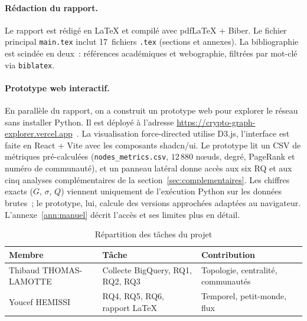 \paragraph{R\'edaction du rapport.}
Le rapport est r\'edig\'e en \LaTeX{} et compil\'e avec pdf\LaTeX{} + Biber.
Le fichier principal \texttt{main.tex} inclut 17~fichiers \texttt{.tex}
(sections et annexes). La bibliographie est scind\'ee en deux~: r\'ef\'erences
acad\'emiques et webographie, filtr\'ees par mot-cl\'e via \texttt{biblatex}.

\paragraph{Prototype web interactif.}
En parall\`ele du rapport, on a construit un prototype web pour explorer
le r\'eseau sans installer Python. Il est d\'eploy\'e \`a l'adresse
\url{https://crypto-graph-explorer.vercel.app}~\cite{cryptographexplorer_web}.
La visualisation force-directed utilise D3.js, l'interface est faite en
React + Vite avec les composants shadcn/ui. Le prototype lit un CSV de
m\'etriques pr\'e-calcul\'ees (\texttt{nodes\_metrics.csv}, $12\,880$
n\oe{}uds, degr\'e, PageRank et num\'ero de communaut\'e), et un panneau
lat\'eral donne acc\`es aux six RQ et aux cinq analyses compl\'ementaires
de la section~\ref{sec:complementaires}. Les chiffres exacts ($G$,
$\sigma$, $Q$) viennent uniquement de l'ex\'ecution Python sur les
donn\'ees brutes~; le prototype, lui, calcule des versions approch\'ees
adapt\'ees au navigateur. L'annexe~\ref{ann:manuel} d\'ecrit l'acc\`es
et ses limites plus en d\'etail.

\begin{table}[H]
\centering
\caption{R\'epartition des t\^aches du projet}
\label{tab:repartition}
\begin{tabular}{lll}
\toprule
\textbf{Membre} & \textbf{T\^ache} & \textbf{Contribution} \\
\midrule
Thibaud THOMAS-LAMOTTE & Collecte BigQuery, RQ1, RQ2, RQ3 & Topologie, centralit\'e, communaut\'es \\
Youcef HEMISSI & RQ4, RQ5, RQ6, rapport \LaTeX{} & Temporel, petit-monde, flux \\
\bottomrule
\end{tabular}
\end{table}
